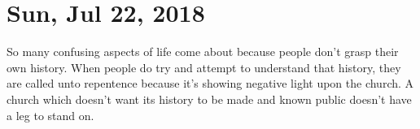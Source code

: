 \section{Sun, Jul 22, 2018}

So many confusing aspects of life come about because people don't grasp their own
history. When people do try and attempt to understand that history, they are called
unto repentence because it's showing negative light upon the church. A church which
doesn't want its history to be made and known public doesn't have a leg to stand on.